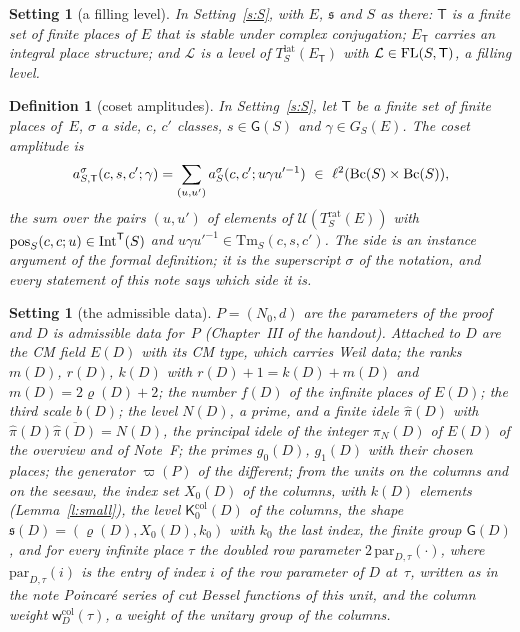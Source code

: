 \documentclass[11pt,a4paper]{article}
\makeatletter
\newcommand{\lean}[1]{\csname LN@#1\endcsname}
\newcommand{\m}[1]{\mbox{$#1$}}        %
\newcommand{\leantag}{{\sffamily\bfseries\fontsize{6.3}{8}\selectfont\color{leancol}\addfontfeatures{LetterSpace=7}LEAN}}
\newcommand{\leanline}[1]{\par\nopagebreak\vspace{-2.5pt}{\fontsize{8.9}{12.4}\selectfont\color{inksoft}\raggedright
  \noindent\llap{\leantag\hspace{9pt}}#1\par}\vspace{1pt}}
\theoremstyle{plainx}
\theoremstyle{uprightx}
\newtheorem{definition}[theorem]{Definition}
\newtheorem{setting}[theorem]{Setting}          %
\newcommand{\fs}{\mathfrak{s}}                      %
\newcommand{\sT}{\mathsf{T}}                        %
\newcommand{\cL}{\mathcal{L}}                       %
\newcommand{\ET}[1]{E_{#1}}                         %
\newcommand{\Trat}[2]{T^{\mathrm{rat}}_{#1}(#2)}    %
\newcommand{\Tlat}[2]{T^{\mathrm{lat}}_{#1}(#2)}    %
\newcommand{\GS}[2]{G_{#1}(#2)}                     %
\newcommand{\GRes}[1]{\mathsf{G}(#1)}               %
\newcommand{\Bc}[1]{\mathrm{Bc}(#1)}                %
\newcommand{\pos}[4]{\mathrm{pos}_{#1}(#2,#3;#4)}   %
\newcommand{\terms}[4]{\mathrm{Tm}_{#1}(#2,#3,#4)}  %
\newcommand{\amp}[5]{a^{#1}_{#2}(#3,#4;#5)}         %
\newcommand{\UT}[1]{\mathcal{U}(#1)}                %
\newcommand{\sGD}[1]{\mathsf{G}(#1)}                %
\newcommand{\Colv}[2]{\mathsf{K}^{\mathrm{col}}_{#2}(#1)}    %
\newcommand{\rowPar}[3]{\mathrm{par}_{#1,#2}(#3)}   %
\makeatother
\begin{document}
\begin{setting}[a filling level]\label{s:T}
In Setting~\ref{s:S}, with $E$, $\fs$ and $S$ as there: $\sT$ is a finite set of finite places of $E$ that is
stable under complex conjugation; \m{\ET{\sT}} carries an integral place structure; and $\cL$ is a level of
\m{\Tlat{S}{\ET{\sT}}} with \m{\isFL{S}{\sT}{\cL}}, a filling level.
\end{setting}

\begin{definition}[coset amplitudes]\label{d:cosamp}
In Setting~\ref{s:S}, let $\sT$ be a finite set of finite places of~$E$, $\sigma$ a side, $c$, $c'$ classes,
\m{s\in\GRes{S}} and \m{\gamma\in\GS{S}{E}}. The \emph{coset amplitude} is
\[\cosamp{S}{\sT}{c}{s}{c'}{\gamma}=\sum_{(u,u')}\amp{\sigma}{S}{c}{c'}{u\gamma u'^{-1}}\ \in\ \ell^2(\Bc{S}\times\Bc{S}),\]
the sum over the pairs \m{(u,u')} of elements of \m{\UT{\Trat{S}{E}}} with \m{\intoff{S}{\sT}{\pos{S}{c}{c}{u}}} and
\m{u\gamma u'^{-1}\in\terms{S}{c}{s}{c'}}. The side is an instance argument of the formal definition; it is the
superscript $\sigma$ of the notation, and every statement of this note says which side it is.
\end{definition}
\leanline{\lean{cosetAmplitude}}

\begin{setting}[the admissible data]\label{s:D}
\m{P=(N_0,d)} are the parameters of the proof and $D$ is admissible data for~$P$ (Chapter~III of the handout).
Attached to $D$ are the CM field \m{E(D)} with its CM type, which carries Weil data; the ranks \m{m(D)},
\m{r(D)}, \m{k(D)} with \m{r(D)+1=k(D)+m(D)} and \m{m(D)=2\varrho(D)+2}; the number \m{f(D)} of the infinite places
of \m{E(D)}; the third scale \m{b(D)}; the level \m{N(D)}, a prime, and a finite idele \m{\hat\pi(D)} with
\m{\hat\pi(D)\overline{\hat\pi(D)}=N(D)}, the principal idele of the integer \m{\pi_N(D)} of \m{E(D)} of the
overview and of Note~F; the primes \m{g_0(D)}, \m{g_1(D)} with their chosen places; the generator
\m{\varpi(P)} of the different; from the units on the columns and on the seesaw, the index set \m{X_0(D)} of
the columns, with \m{k(D)} elements (Lemma~\ref{l:small}), the level \m{\Colv{D}{0}} of the columns, the shape
\m{\fs(D)=(\varrho(D),X_0(D),k_0)} with $k_0$ the last index, the finite group \m{\sGD{D}}, and for every infinite
place $\tau$ the doubled row parameter \m{2\,\rowPar{D}{\tau}{\cdot}}, where \m{\rowPar{D}{\tau}{i}} is the entry of
index $i$ of the row parameter of $D$ at~$\tau$, written as in the note \emph{Poincaré series of cut Bessel
functions} of this unit, and the column weight
\m{\mathsf{w}^{\mathrm{col}}_D(\tau)}, a weight of the unitary group of the columns.
\end{setting}
\end{document}
